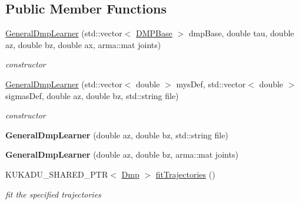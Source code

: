 \subsection*{Public Member Functions}
\begin{DoxyCompactItemize}
\item 
\hyperlink{classkukadu_1_1GeneralDmpLearner_a267ea59435a0bf8e2b29ad06fbb07122}{General\-Dmp\-Learner} (std\-::vector$<$ \hyperlink{classkukadu_1_1DMPBase}{D\-M\-P\-Base} $>$ dmp\-Base, double tau, double az, double bz, double ax, arma\-::mat joints)
\begin{DoxyCompactList}\small\item\em constructor \end{DoxyCompactList}\item 
\hyperlink{classkukadu_1_1GeneralDmpLearner_a317520b316d8d6e75206237f0848b3c1}{General\-Dmp\-Learner} (std\-::vector$<$ double $>$ mys\-Def, std\-::vector$<$ double $>$ sigmas\-Def, double az, double bz, std\-::string file)
\begin{DoxyCompactList}\small\item\em constructor \end{DoxyCompactList}\item 
\hypertarget{classkukadu_1_1GeneralDmpLearner_ab9adb95165d0799c1abe7038b088c419}{{\bfseries General\-Dmp\-Learner} (double az, double bz, std\-::string file)}\label{classkukadu_1_1GeneralDmpLearner_ab9adb95165d0799c1abe7038b088c419}

\item 
\hypertarget{classkukadu_1_1GeneralDmpLearner_afc0a3a13e70d079cc33ee157b2e8adfe}{{\bfseries General\-Dmp\-Learner} (double az, double bz, arma\-::mat joints)}\label{classkukadu_1_1GeneralDmpLearner_afc0a3a13e70d079cc33ee157b2e8adfe}

\item 
\hypertarget{classkukadu_1_1GeneralDmpLearner_a4f2f314a7bfb0d9ff54fabbb038757c8}{K\-U\-K\-A\-D\-U\-\_\-\-S\-H\-A\-R\-E\-D\-\_\-\-P\-T\-R$<$ \hyperlink{classkukadu_1_1Dmp}{Dmp} $>$ \hyperlink{classkukadu_1_1GeneralDmpLearner_a4f2f314a7bfb0d9ff54fabbb038757c8}{fit\-Trajectories} ()}\label{classkukadu_1_1GeneralDmpLearner_a4f2f314a7bfb0d9ff54fabbb038757c8}

\begin{DoxyCompactList}\small\item\em fit the specified trajectories \end{DoxyCompactList}\end{DoxyCompactItemize}
